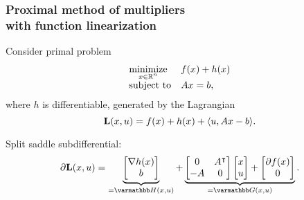 \documentclass[10pt,mathserif]{beamer}
\begin{document}
\begin{frame}
\frametitle{Proximal method of multipliers\\ with function linearization}
Consider primal problem
\[
\begin{array}{ll}
\underset{\substack{x\in \mathbb{R}^n}}{\mbox{minimize}}&f(x)+h(x)\\
\mbox{subject to}&Ax=b,
\end{array}
\]
where $h$ is differentiable, generated by the Lagrangian
\begin{equation*}
\mathbf{L}(x, u )=f(x)+h(x)+\langle  u , Ax-b\rangle.
\end{equation*}
\vspace{0.2in}

Split saddle subdifferential:
\[
\partial \lagrange(x, u )
=
\underbrace{
\begin{bmatrix}
\nabla h(x)\\
b
\end{bmatrix}}
_{=\opH(x, u )}
+
\underbrace{
\begin{bmatrix}
0&A^\intercal\\
-A&0
\end{bmatrix}
\begin{bmatrix}
x\\
 u 
\end{bmatrix}
+
\begin{bmatrix}
\partial f(x)\\
0
\end{bmatrix}
}
_{=\opG(x, u )}.
\]
\end{frame}
\end{document}
